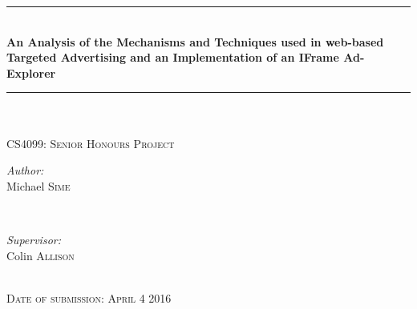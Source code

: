 \documentclass[12pt]{article}
\begin{document}
\begin{titlepage}

\newcommand{\HRule}{\rule{\linewidth}{0.5mm}} %

\center %


\HRule \\[0.4cm]
{ \Huge \bfseries An Analysis of the Mechanisms and Techniques used in web-based Targeted Advertising and an Implementation of an IFrame Ad-Explorer}\\
\HRule \\[1.5cm]



\\
 


\textsc{\Large CS4099: Senior Honours Project}\\[1cm]


\begin{minipage}{0.4\textwidth}
\begin{flushleft} \large
\emph{Author:}\\
Michael \textsc{Sime} %
\end{flushleft}
\end{minipage}
~
\begin{minipage}{0.4\textwidth}
\begin{flushright} \large
\emph{Supervisor:} \\
Colin \textsc{Allison} %
\end{flushright}
\end{minipage}\\ [0.75cm]



\textsc{Date of submission: April 4 2016}\\

\vfill %

\end{titlepage}
\end{document}
